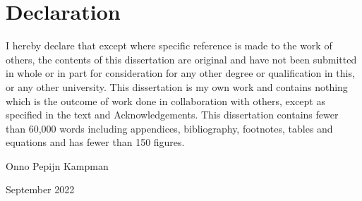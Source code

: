 \chapter*{Declaration}

I hereby declare that except where specific reference is made to the work of others, the contents of this dissertation are original and have not been submitted in whole or in part for consideration for any other degree or qualification in this, or any other university.
This dissertation is my own work and contains nothing which is the outcome of work done in collaboration with others, except as specified in the text and Acknowledgements.
This dissertation contains fewer than 60,000 words including appendices, bibliography, footnotes, tables and equations and has fewer than 150 figures.

\hspace*{\fill} Onno Pepijn Kampman

\hspace*{\fill} September 2022
